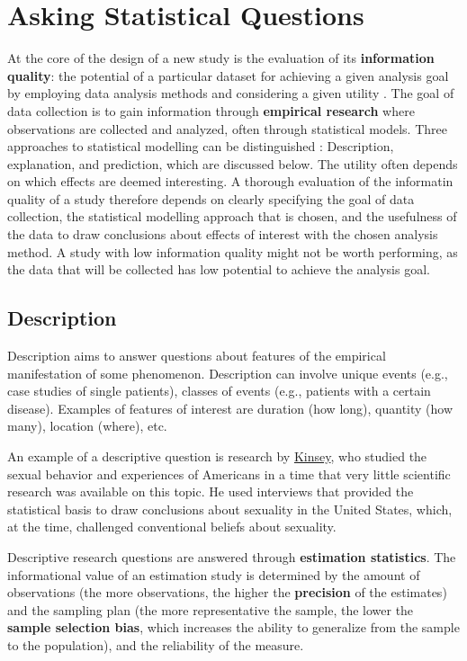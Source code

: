 \documentclass[
  oneside]{book}
\begin{document}
\hypertarget{questions}{%
\chapter{Asking Statistical Questions}\label{questions}}

At the core of the design of a new study is the evaluation of its \textbf{information quality}: the potential of a particular dataset for achieving a given analysis goal by employing data analysis methods and considering a given utility
\citep{kenett_information_2016}. The goal of data collection is to gain information through \textbf{empirical research} where observations are collected and analyzed, often through statistical models. Three approaches to statistical modelling can be distinguished \citet{shmueli_explain_2010}: Description, explanation, and prediction, which are discussed below. The utility often depends on which effects are deemed interesting. A thorough evaluation of the informatin quality of a study therefore depends on clearly specifying the goal of data collection, the statistical modelling approach that is chosen, and the usefulness of the data to draw conclusions about effects of interest with the chosen analysis method. A study with low information quality might not be worth performing, as the data that will be collected has low potential to achieve the analysis goal.

\hypertarget{description}{%
\section{Description}\label{description}}

Description aims to answer questions about features of the empirical manifestation of some phenomenon. Description can involve unique events (e.g., case studies of single patients), classes of events (e.g., patients with a certain disease). Examples of features of interest are duration (how long), quantity (how many), location (where), etc.

An example of a descriptive question is research by \href{https://en.wikipedia.org/wiki/Kinsey_Reports}{Kinsey}, who studied the sexual behavior and experiences of Americans in a time that very little scientific research was available on this topic. He used interviews that provided the statistical basis to draw conclusions about sexuality in the United States, which, at the time, challenged conventional beliefs about sexuality.

Descriptive research questions are answered through \textbf{estimation statistics}. The informational value of an estimation study is determined by the amount of observations (the more observations, the higher the \textbf{precision} of the estimates) and the sampling plan (the more representative the sample, the lower the \textbf{sample selection bias}, which increases the ability to generalize from the sample to the population), and the reliability of the measure.
\end{document}
